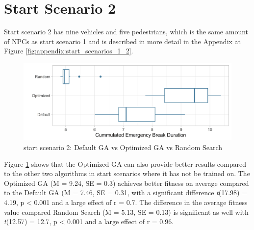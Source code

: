 \section{Start Scenario 2}
Start scenario 2 has nine vehicles and five pedestrians, which is the same amount of NPCs as start scenario 1 and is described in more detail in the Appendix at Figure \ref{fig:appendix:start_scenarios_1_2}.

\begin{figure}[ht] 
	\includegraphics[width=1\linewidth]{simulations/evaluation/plots/sim_2_comparison}
	\caption{start scenario 2: Default GA vs Optimized GA vs Random Search}
	\label{fig:evaluation:sim_2_comparison}
\end{figure}

Figure \ref{fig:evaluation:sim_2_comparison} shows that the Optimized GA can also provide better results compared to the other two algorithms in start scenarios where it has not be trained on. The Optimized GA (M = 9.24, SE = 0.3) achieves better fitness on average compared to the Default GA (M = 7.46, SE = 0.31, with a significant difference \textit{t}(17.98) = 4.19, p < 0.001 and a large effect of r = 0.7. The difference in the average fitness value compared Random Search (M = 5.13, SE = 0.13) is significant as well with \textit{t}(12.57) = 12.7, p < 0.001 and a large effect of r = 0.96.

